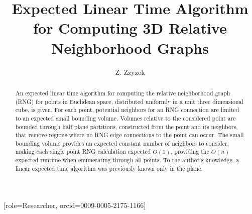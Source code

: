 \documentclass[a4paper,fleqn]{cas-dc}
\begin{document}
\let\WriteBookmarks\relax
\def\floatpagepagefraction{1}
\def\textpagefraction{.001}

\title [mode = title]{Expected Linear Time Algorithm for Computing 3D Relative Neighborhood Graphs}                      



\author[1]{Z. Zzyzek}[role=Researcher,
                   orcid=0009-0005-2175-1166]
\cormark[1]
\fnmark[1]


\begin{abstract}
  An expected linear time algorithm for computing the relative neighborhood graph (RNG) for points in Euclidean space,
  distributed uniformly in a unit three dimensional cube, is given.
  For each point, potential neighbors for an RNG connection are limited to an expected small bounding volume.
  Volumes relative to the considered point are bounded through half plane partitions,
  constructed from the point and its neighbors,
  that remove regions where no RNG edge connections to the point can occur.
  The small bounding volume provides an expected constant number of neighbors to consider, making
  each single point RNG calculation expected $O(1)$, providing the $O(n)$ expected runtime when enumerating through all points.
  To the author's knowledge, a linear expected time algorithm was previously known only in the plane.
\end{abstract}

\end{document}
